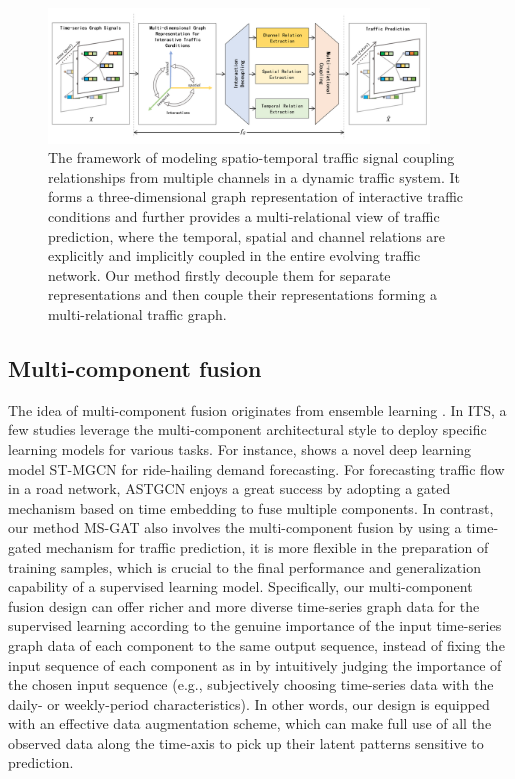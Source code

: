 \begin{figure}[!ht]
    \centering
    \includegraphics[width=0.9\textwidth]{pictures/Core.png}
    \caption{The framework of modeling spatio-temporal traffic signal coupling relationships from multiple channels in a dynamic traffic system. It forms a three-dimensional graph representation of interactive traffic conditions and further provides a multi-relational view of traffic prediction, where the temporal, spatial and channel relations are explicitly and implicitly coupled in the entire evolving traffic network. Our method firstly decouple them for separate representations and then couple their representations forming a multi-relational traffic graph.}
    \label{fig:core}
\end{figure}


\subsection{Multi-component fusion}
The idea of multi-component fusion originates from ensemble learning \cite{dong2020survey}. In ITS, a few studies leverage the multi-component architectural style to deploy specific learning models for various tasks. For instance, \cite{geng2019spatiotemporal} shows a novel deep learning model  ST-MGCN for ride-hailing demand forecasting. For forecasting traffic flow in a road network, ASTGCN \cite{guo2019attention} enjoys a great success by adopting a gated mechanism based on time embedding to fuse multiple components. In contrast, our method MS-GAT also involves the multi-component fusion by using a time-gated mechanism for traffic prediction, it is more flexible in the preparation of training samples, which is crucial to the final performance and generalization capability of a supervised learning model. Specifically, our multi-component fusion design can offer richer and more diverse time-series graph data for the supervised learning according to the genuine importance of the input time-series graph data of each component to the same output sequence, instead of fixing the input sequence of each component as in \cite{guo2019attention} by intuitively judging the importance of the chosen input sequence (e.g., subjectively choosing time-series data with the daily- or weekly-period characteristics). In other words, our design is equipped with an effective data augmentation scheme, which can make full use of all the observed data along the time-axis to pick up their latent patterns sensitive to prediction.


